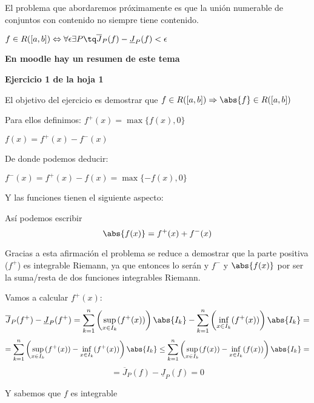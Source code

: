 \documentclass{apuntes}
\begin{document}
El problema que abordaremos próximamente es que la unión numerable de conjuntos con contenido no siempre tiene contenido.

\obs $f\in R([a,b]) \Leftrightarrow \forall \epsilon \exists P \tq \overline{J}_P(f)-\underline{J}_P(f) < \epsilon$


\textbf{En moodle hay un resumen de este tema}

\begin{example}
\textbf{Ejercicio 1 de la hoja 1}

El objetivo del ejercicio es demostrar que $f\in R([a,b]) \Rightarrow \abs{f}\in R([a,b])$

Para ellos definimos:
$f^+(x) = \max\lbrace f(x), 0 \rbrace$

$f(x) = f^+(x) - f^-(x)$

De donde podemos deducir:

$f^-(x) = f^+(x)-f(x)=\max \lbrace -f(x), 0 \rbrace$

Y las funciones tienen el siguiente aspecto:

\begin{center}
\end{center}


Así podemos escribir \[ \abs{f(x)} = f^+(x)+f^-(x) \]

Gracias a esta afirmación el problema se reduce a demostrar que la parte positiva ($f^+$) es integrable Riemann, ya que entonces lo serán  y $f^-$  y $\abs{f(x)}$  por ser la suma/resta de dos funciones integrables Riemann.


Vamos a calcular $f^+(x)$:
\[\overline{J}_P(f^+)-\underline{J}_P(f^+) = \sum_{k=1}^n\left(\sup_{x\in I_k}(f^+(x))\right)\abs{I_k} - \sum_{k=1}^n\left(\inf_{x\in I_k}(f^+(x))\right)\abs{I_k}=\]
\[= \sum_{k=1}^n\left(\sup_{x\in I_k}(f^+(x))-\inf_{x\in I_k}(f^+(x))\right)\abs{I_k} \leq
\sum_{k=1}^n\left(\sup_{x\in I_k}(f(x))-\inf_{x\in I_k}(f(x))\right)\abs{I_k} =\] \[=\overline{J}_P(f)-\underline{J}_P(f) = 0\]

Y sabemos que $f$ es integrable
\end{example}
\end{document}
